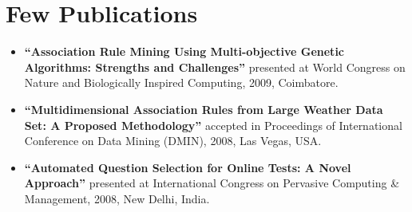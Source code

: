 \documentclass{article}
\begin{document}
\section{Few Publications}
\begin{itemize}[leftmargin=-1ex]\setlength\itemsep{0.25em}\vspace{-10pt}
\item \textbf{``Association Rule Mining Using Multi-objective Genetic Algorithms: Strengths and Challenges''} presented at World Congress on Nature and Biologically Inspired Computing, 2009, Coimbatore. 
\item \textbf{``Multidimensional Association Rules from Large Weather Data Set: A Proposed Methodology''} accepted in Proceedings of International Conference on  Data Mining (DMIN), 2008, Las Vegas, USA. 
\item \textbf{``Automated Question Selection for Online Tests: A Novel Approach''} presented at International Congress on Pervasive Computing \& Management, 2008, New Delhi, India. 
\end{itemize}
\end{document}
